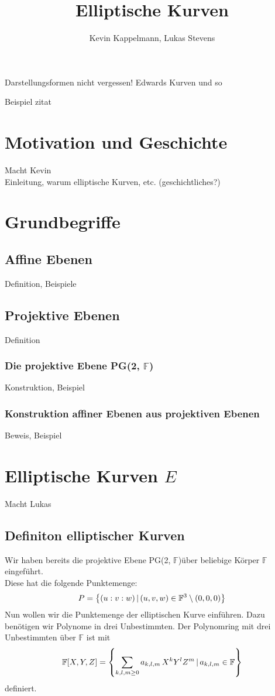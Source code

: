 \documentclass[hidelinks]{article}
\title{Elliptische Kurven}
\author{Kevin Kappelmann, Lukas Stevens}
\newcommand{\pgtwo}{PG(2, $\mathbb{F}$)\thinspace}
\newcommand{\mybar}{\thinspace | \thinspace}
\begin{document}
\maketitle
\newpage
\tableofcontents
\newpage

Darstellungsformen nicht vergessen! Edwards Kurven und so

Beispiel zitat
\cite[Kapitel~5, S.~215]{blablubb}

\section{Motivation und Geschichte}
Macht Kevin\\
Einleitung, warum elliptische Kurven, etc. (geschichtliches?)
\section{Grundbegriffe}
\subsection{Affine Ebenen}
Definition, Beispiele
\subsection{Projektive Ebenen}
Definition
\subsubsection{Die projektive Ebene \pgtwo}
Konstruktion, Beispiel
\subsubsection{Konstruktion affiner Ebenen aus projektiven Ebenen}
Beweis, Beispiel
\section{Elliptische Kurven $E$}
Macht Lukas\\
\subsection{Definiton elliptischer Kurven}
Wir haben bereits die projektive Ebene \pgtwo über beliebige Körper $\mathbb{F}$ eingeführt. \\
Diese hat die folgende Punktemenge:
\begin{equation}
    P = \left\{(u:v:w) \mybar (u,v,w) \in \mathbb{F}^3 \setminus (0,0,0) \right\}
\end{equation}
Nun wollen wir die Punktemenge der elliptischen Kurve einführen. Dazu benötigen wir Polynome in drei Unbestimmten.
Der Polynomring mit drei Unbestimmten über $\mathbb{F}$ ist mit 
\begin{equation}
    \mathbb{F}[X,Y,Z] = \left\{ \sum_{k,l,m \geq 0} a_{k,l,m} \thinspace X^k Y^l Z^m \mybar a_{k,l,m} \in \mathbb{F} \right\}
\end{equation}
definiert.
\end{document}
